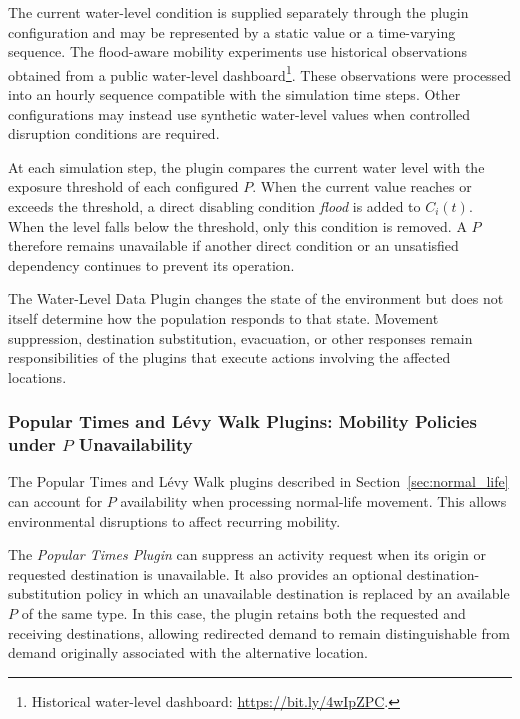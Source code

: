 The current water-level condition is supplied separately through the plugin configuration and may be represented by a static value or a time-varying sequence. The flood-aware mobility experiments use historical observations obtained from a public water-level dashboard\footnote{Historical water-level dashboard: \url{https://bit.ly/4wIpZPC}.}. These observations were processed into an hourly sequence compatible with the simulation time steps. Other configurations may instead use synthetic water-level values when controlled disruption conditions are required.

At each simulation step, the plugin compares the current water level with the exposure threshold of each configured $P$. When the current value reaches or exceeds the threshold, a direct disabling condition \textit{flood} is added to $C_i(t)$. When the level falls below the threshold, only this condition is removed. A $P$ therefore remains unavailable if another direct condition or an unsatisfied dependency continues to prevent its operation.

The Water-Level Data Plugin changes the state of the environment but does not itself determine how the population responds to that state. Movement suppression, destination substitution, evacuation, or other responses remain responsibilities of the plugins that execute actions involving the affected locations.


\subsubsection{Popular Times and L\'evy Walk Plugins: Mobility Policies under $P$ Unavailability} 
\label{sec:availability_aware_mobility_plugins} 

The Popular Times and L\'evy Walk plugins described in Section~\ref{sec:normal_life} can account for $P$ availability when processing normal-life movement. This allows environmental disruptions to affect recurring mobility.

The \textit{Popular Times Plugin} can suppress an activity request when its origin or requested destination is unavailable. It also provides an optional destination-substitution policy in which an unavailable destination is replaced by an available $P$ of the same type. In this case, the plugin retains both the requested and receiving destinations, allowing redirected demand to remain distinguishable from demand originally associated with the alternative location. 

